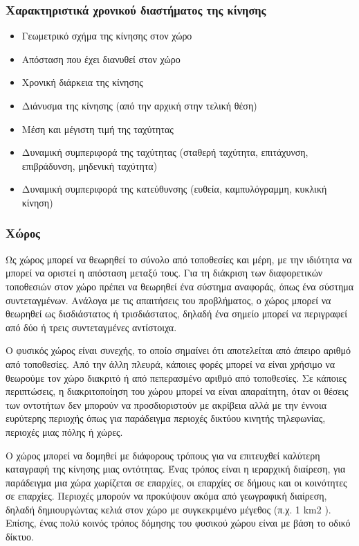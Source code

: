 \documentclass[12pt,twoside,openright]{report}
\begin{document}
\subsubsection*{Χαρακτηριστικά χρονικού διαστήματος της κίνησης}
\begin{itemize}
  \item Γεωμετρικό σχήμα της κίνησης στον χώρο
  \item Απόσταση που έχει διανυθεί στον χώρο
  \item	Χρονική διάρκεια της κίνησης
  \item Διάνυσμα της κίνησης (από την αρχική στην τελική θέση)
  \item Μέση και μέγιστη τιμή της ταχύτητας
  \item Δυναμική συμπεριφορά της ταχύτητας (σταθερή ταχύτητα, επιτάχυνση, επιβράδυνση, μηδενική ταχύτητα)
  \item Δυναμική συμπεριφορά της κατεύθυνσης (ευθεία, καμπυλόγραμμη, κυκλική κίνηση)
\end{itemize}

\subsubsection*{Χώρος}
Ως χώρος μπορεί να θεωρηθεί το σύνολο από τοποθεσίες και μέρη, με την ιδιότητα να μπορεί να οριστεί η απόσταση μεταξύ τους. Για τη διάκριση των διαφορετικών τοποθεσιών στον χώρο πρέπει να θεωρηθεί ένα σύστημα αναφοράς, όπως ένα σύστημα συντεταγμένων. Ανάλογα με τις απαιτήσεις του προβλήματος, ο χώρος μπορεί να θεωρηθεί ως δισδιάστατος ή τρισδιάστατος, δηλαδή ένα σημείο μπορεί να περιγραφεί από δύο ή τρεις συντεταγμένες αντίστοιχα.

Ο φυσικός χώρος είναι συνεχής, το οποίο σημαίνει ότι αποτελείται από άπειρο αριθμό από τοποθεσίες. Από την άλλη πλευρά, κάποιες φορές μπορεί να είναι χρήσιμο να θεωρούμε τον χώρο διακριτό ή από πεπερασμένο αριθμό από τοποθεσίες. Σε κάποιες περιπτώσεις, η διακριτοποίηση του χώρου μπορεί να είναι απαραίτητη, όταν οι θέσεις των οντοτήτων δεν μπορούν να προσδιοριστούν με ακρίβεια αλλά με την έννοια ευρύτερης περιοχής όπως για παράδειγμα περιοχές δικτύου κινητής τηλεφωνίας, περιοχές μιας πόλης ή χώρες.

Ο χώρος μπορεί να δομηθεί με διάφορους τρόπους για να επιτευχθεί καλύτερη καταγραφή της κίνησης μιας οντότητας. Ένας τρόπος είναι η ιεραρχική διαίρεση, για παράδειγμα μια χώρα χωρίζεται σε επαρχίες, οι επαρχίες σε δήμους και οι κοινότητες σε επαρχίες. Περιοχές μπορούν να προκύψουν ακόμα από  γεωγραφική διαίρεση, δηλαδή δημιουργώντας κελιά στον χώρο με συγκεκριμένο μέγεθος (π.χ. 1 \lt km2 \gt). Επίσης, ένας πολύ κοινός τρόπος δόμησης του φυσικού χώρου είναι με βάση το οδικό δίκτυο.
\end{document}

